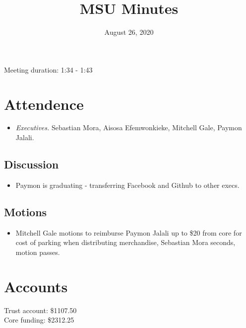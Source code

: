 \documentclass[12pt]{article}
\title{MSU Minutes}
\date{August 26, 2020}
\begin{document}
\maketitle

Meeting duration: 1:34 - 1:43

\section*{Attendence}
\begin{itemize}
\item \textit{Executives.} Sebastian Mora, Aisosa Efemwonkieke, Mitchell Gale, Paymon Jalali.
\end{itemize}

\subsection*{Discussion}
\begin{itemize}
\item Paymon is graduating - transferring Facebook and Github to other execs.
\end{itemize}

\subsection*{Motions}
\begin{itemize}
\item Mitchell Gale motions to reimburse Paymon Jalali up to \$20 from core for cost of parking when distributing merchandise, Sebastian Mora seconds, motion passes.
\end{itemize}

\section*{Accounts}
Trust account: \$1107.50 \\
Core funding: \$2312.25 \\
\end{document}
